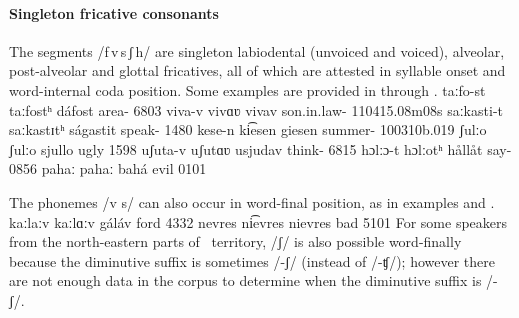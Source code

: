 \paragraph{Singleton fricative consonants}\label{fvssjh}
The segments \mbox{/f\,v\,s\,ʃ\,h/} are singleton labiodental (unvoiced and voiced), alveolar, post-alveolar and glottal fricatives, all of which are attested in syllable onset and word-internal coda position. %
Some examples are provided in  through .
	{taː{f}o-st}		{taː{f}ostʰ}		{dáfost}	{area-}		{6803}
	{{v}i{v}a-v}	{{v}i{v}ɑʋ}		{vivav}	{son.in.law-}	{110415}{.08m08s}
		{{s}aːka{s}ti-t}	{{s}aːka{s}tɪtʰ}	{ságastit}	{speak-}		{1480}
	{ke{s}e-n}		{ki͡e{s}en}		{giesen}	{summer-}	{100310b}{.019}
			{{ʃ}ulːo}			{{ʃ}ulːo}			{sjullo}	{ugly\Sc{}}		{1598}
	{u{ʃ}uta-v}		{u{ʃ}utɑʋ}		{usjudav}	{think-}		{6815}
			{{h}ɔlːɔ-t}		{{h}ɔlːotʰ}		{hållåt}	{say-}	{0856}
		{pa{h}aː}		{pa{h}aː}		{bahá}	{evil\BS{}}	{0101}

The phonemes /v s/ can also occur in word-final position, as in examples  and .%
	{kaːlaː{v}}	{kaːlɑː{v}}	{gáláv}	{ford\BS{}}	{4332}
		{nevre{s}}	{ni͡evre{s}}	{nievres}	{bad\Sc{}}	{5101}
For some speakers from the north-eastern parts of \PS\ territory, /ʃ/ is also possible word-finally because the diminutive suffix is sometimes /-ʃ/ (instead of /-ʧ/); however there are not enough data in the corpus to determine when the diminutive suffix is /-ʃ/. 

